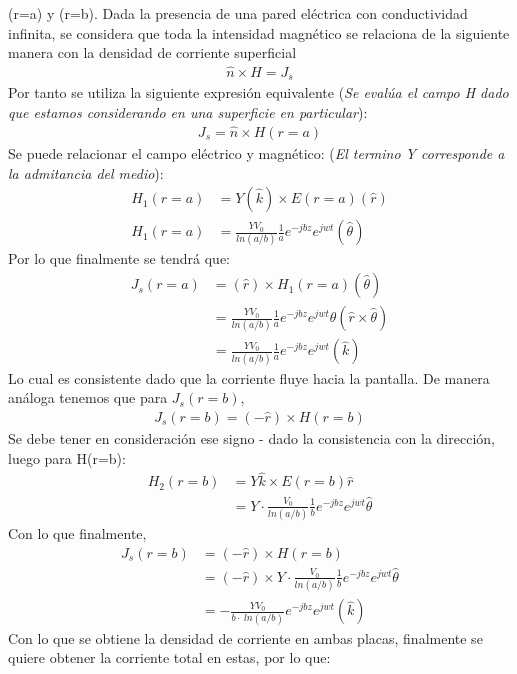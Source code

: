 \documentclass[
  11pt,
  letterpaper,
   addpoints,
   answers
  ]{exam}
\begin{document}
\begin{questions}
\begin{solution}
\begin{enumerate}
(r=a) y (r=b). Dada la presencia de una pared eléctrica con conductividad infinita, se considera que toda la intensidad magnético se relaciona de la siguiente manera con la densidad de corriente superficial 
\begin{align}
    \hat{n} \times H = J_{s}
\end{align}
Por tanto se utiliza la siguiente expresión equivalente (\textit{Se evalúa el campo H dado que estamos considerando en una superficie en particular}):
\begin{align}
    J_{s}= \hat{n} \times H(r=a)
\end{align}
Se puede relacionar el campo eléctrico y magnético: (\textit{El termino Y corresponde a la admitancia del medio}):
\begin{align}
    H_{1}(r=a) &= Y(\hat{k}) \times E(r=a) (\hat{r})\\ H_{1}(r=a) &= \frac{Y V_{0}}{ln(a/b)} \frac{1}{a} e^{-jbz}e^{jwt}(\hat{\theta})
\end{align}
Por lo que finalmente se tendrá que:
\begin{align}
    J_{s}(r=a)&= (\hat{r}) \times H_{1}(r=a) (\hat{\theta})  \\
     &= \frac{Y V_{0}}{ln(a/b)} \frac{1}{a} e^{-jbz}e^{jwt}\hat{\theta}(\hat{r} \times \hat{\theta}) \\
     &= \frac{YV_{0}}{ln(a/b)} \frac{1}{a} e^{-jbz}e^{jwt}(\hat{k})
\end{align}
Lo cual es consistente dado que la corriente fluye hacia la pantalla. De manera análoga tenemos que para $J_{s}(r=b)$,
\begin{align}
    J_{s}(r=b) = (-\hat{r}) \times H(r=b) 
\end{align}
Se debe tener en consideración ese signo - dado la consistencia con la dirección, luego para  H(r=b):
\begin{align}
    H_{2}(r=b) &= Y\hat{k} \times E(r=b)\hat{r}\\
    &= Y \cdot \frac{V_{0}}{ln(a/b)} \frac{1}{b} e^{-jbz}e^{jwt}\hat{\theta}
\end{align}
Con lo que finalmente,
\begin{align}
    J_{s}(r=b) &= (-\hat{r}) \times H(r=b) \\
               &=  (-\hat{r}) \times Y \cdot \frac{V_{0}}{ln(a/b)} \frac{1}{b} e^{-jbz}e^{jwt}\hat{\theta}\\
               &= -\frac{YV_{0}}{b\cdot\
               ln(a/b)} e^{-jbz}e^{jwt} (\hat{k})
\end{align}
Con lo que se obtiene la densidad de corriente en ambas placas, finalmente se quiere obtener la corriente total en estas, por lo que:

\end{enumerate}
\end{solution}
\end{questions}
\end{document}
